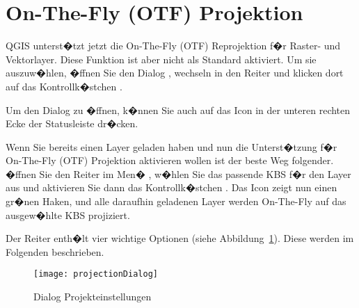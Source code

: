 \section{On-The-Fly (OTF) Projektion}\label{label_projstart}

QGIS unterst�tzt jetzt die On-The-Fly (OTF) Reprojektion f�r Raster- und 
Vektorlayer. Diese Funktion ist aber nicht als Standard aktiviert. Um sie 
auszuw�hlen, �ffnen Sie den Dialog 
, wechseln in den Reiter
 und klicken dort auf das Kontrollk�stchen 
. 

Um den Dialog  zu �ffnen, k�nnen Sie auch auf das Icon 
 in der unteren rechten Ecke der 
Statusleiste dr�cken.

Wenn Sie bereits einen Layer geladen haben und nun die Unterst�tzung f�r
On-The-Fly (OTF) Projektion aktivieren wollen ist der beste Weg folgender.
�ffnen Sie den Reiter  im Men� , w�hlen Sie das passende KBS f�r den Layer aus und 
aktivieren Sie dann das Kontrollk�stchen . Das Icon  zeigt nun einen gr�nen
Haken, und alle daraufhin geladenen Layer werden On-The-Fly auf das
ausgew�hlte KBS projiziert. 

Der Reiter  enth�lt vier wichtige Optionen 
(siehe Abbildung~\ref{fig:projections}). Diese werden im Folgenden beschrieben.

\begin{figure}[ht]
   \begin{center}
   \caption{Dialog Projekteinstellungen \nixcaption}\label{fig:projections}\smallskip
   \texttt{[image: projectionDialog]}
\end{center}  
\end{figure}

